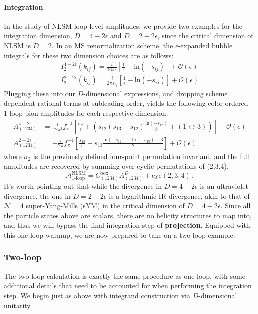 \documentclass[12pt,letter]{article}
\def\be{\begin{equation}}
\def\ee{\end{equation}}
\begin{document}
\paragraph{\textbf{Integration}}  In the study of NLSM loop-level amplitudes, we provide two examples for the integration dimension, $D=4-2\epsilon$ and $D=2-2\epsilon$, since the critical dimension of NLSM is $D=2$. In an $\overline{\text{MS}}$ renormalization scheme, the $\epsilon$-expanded bubble integrals for these two dimension choices are as follows:
\begin{align}
I_2^{4-2\epsilon}(k_{ij}) = \frac{i}{16\pi^2}\left[\frac{1}{\epsilon} - \text{ln}(-s_{ij})\right]+\mathcal{O}(\epsilon)
\\
I_2^{2-2\epsilon}(k_{ij}) = \frac{i}{2\pi s_{ij}}\left[\frac{1}{\epsilon} - \text{ln}(-s_{ij})\right]+\mathcal{O}(\epsilon)
\end{align}
Plugging these into our $D$-dimensional expressions, and dropping scheme dependent rational terms at subleading order, yields the following color-ordered 1-loop pion amplitudes for each respective dimension:
\begin{align}
A^{4-2\epsilon}_{(1234)} &=\frac{i}{12\pi^2 }f_{\pi}^{-4}\left[\frac{\sigma_2}{\epsilon}+\left(s_{12}(s_{13}-s_{12})\frac{\text{ln}(-s_{12})}{8}+(1\leftrightarrow 3)\right)\right]+\mathcal{O}(\epsilon)
\\
A^{2-2\epsilon}_{(1234)} &= -\frac{i}{2\pi }f_{\pi}^{-4}\left[\frac{s_{13}}{\epsilon}-s_{13}\frac{\text{ln}(-s_{12})+\text{ln}(-s_{23})-3}{2}\right] +\mathcal{O}(\epsilon) \label{eq:1loopPionD2}
\end{align}
where $\sigma_2$ is the previously defined four-point permutation invariant, and the full amplitudes are recovered by summing over cyclic permutations of (2,3,4), 
\be
\mathcal{A}^{\text{NLSM}}_{\text{1-loop}} = C^{\text{box}}_{(1234)}A^{D}_{(1234)}+\text{cyc}(2,3,4)\,.
\ee 
It's worth pointing out that while the divergence in $D=4-2\epsilon$ is an ultraviolet divergence, the one in $D=2-2\epsilon$ is a logarithmic IR divergence, akin to that of $\mathcal{N}=4$ super-Yang-Mills (sYM) in the critical dimension of $D=4-2\epsilon$. Since all the particle states above are scalars, there are no helicity structures to map into, and thus we will bypass the final integration step of \textbf{projection}. Equipped with this one-loop warmup, we are now prepared to take on a two-loop example. 
\subsubsection{Two-loop}\label{sec:2loopNLSM}
The two-loop calculation is exactly the same procedure as one-loop, with some additional details that need to be accounted for when performing the integration step. We begin just as above with integrand construction via $D$-dimensional unitarity. 
\end{document}
